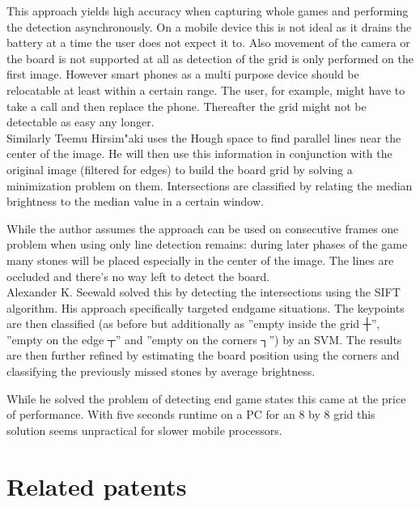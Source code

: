 	This approach yields high accuracy when capturing whole games and performing the detection asynchronously. On a mobile device this is not ideal as it drains the battery at a time the user does not expect it to. Also movement of the camera or the board is not supported at all as detection of the grid is only performed on the first image. However smart phones as a multi purpose device should be relocatable at least within a certain range. The user, for example, might have to take a call and then replace the phone. Thereafter the grid might not be detectable as easy any longer.
	\\

	Similarly Teemu Hirsim"aki \cite{hirsimaki2005extracting} uses the Hough space to find parallel lines near the center of the image. He will then use this information in conjunction with the original image (filtered for edges) to build the board grid by solving a minimization problem on them. Intersections are classified by relating the median brightness to the median value in a certain window.

	While the author assumes the approach can be used on consecutive frames one problem when using only line detection remains: during later phases of the game many stones will be placed especially in the center of the image. The lines are occluded and there's no way left to detect the board.
	\\

	Alexander K. Seewald \cite{seewald2010automatic} solved this by detecting the intersections using the SIFT algorithm. His approach specifically targeted endgame situations. The keypoints are then classified (as before but additionally as ''empty inside the grid ┼'', ''empty on the edge ┬'' and ''empty on the corners ┐'') by an SVM. The results are then further refined by estimating the board position using the corners and classifying the previously missed stones by average brightness.

	While he solved the problem of detecting end game states this came at the price of performance. With five seconds runtime on a PC for an 8 by 8 grid this solution seems unpractical for slower mobile processors.

	\section{Related patents}
	\label{introduction-patents}



